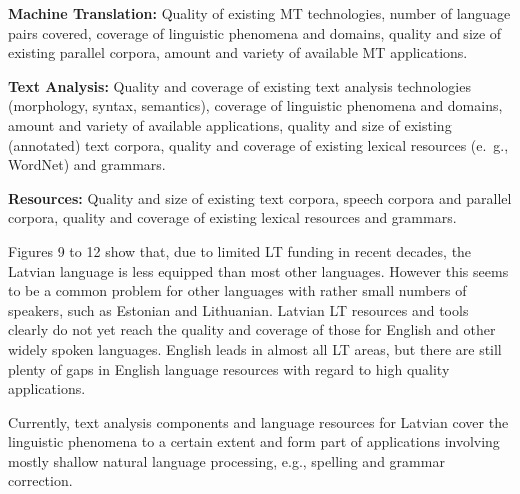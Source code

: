 \begin{multicols}{2}
\textbf{Machine Translation:} Quality of existing MT technologies, number of language pairs covered, coverage of linguistic phenomena and domains, quality and size of existing parallel corpora, amount and variety of available MT applications.

\textbf{Text Analysis:} Quality and coverage of existing text analysis technologies (morphology, syntax, semantics), coverage of linguistic phenomena and domains, amount and variety of available applications, quality and size of existing (annotated) text corpora, quality and coverage of existing lexical resources (e.~g., WordNet) and grammars.

\textbf{Resources:} Quality and size of existing text corpora, speech corpora and parallel corpora, quality and coverage of existing lexical resources and grammars.

Figures 9 to 12 show that, due to limited LT funding in recent decades, the Latvian language is less equipped than most other languages.
However this seems to be a common problem for other languages with rather small numbers of speakers, such as Estonian and Lithuanian.
Latvian LT resources and tools clearly do not yet reach the quality and coverage of those for English and other widely spoken languages.
English leads in almost all LT areas, but there are still plenty of gaps in English language resources with regard to high quality applications.

Currently, text analysis components and language resources for Latvian cover the linguistic phenomena to a certain extent and form part of applications involving mostly shallow natural language processing, e.g., spelling and grammar correction.


\end{multicols}
